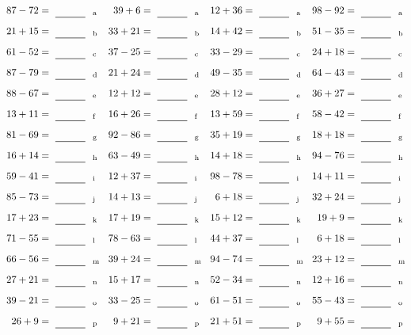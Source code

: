 \documentclass
[
  draft    = true,
  fontsize = 11pt,
  parskip  = half-
]
{scrartcl}
\begin{document}
\clearpage
\begin{align*}
    \pline{87-72}&=\rline{a}
  & \pline{39+6}&=\rline{a}
  & \pline{12+36}&=\rline{a}
  & \pline{98-92}&=\rline{a} \\[1ex]
    \pline{21+15}&=\rline{b}
  & \pline{33+21}&=\rline{b}
  & \pline{14+42}&=\rline{b}
  & \pline{51-35}&=\rline{b} \\[1ex]
    \pline{61-52}&=\rline{c}
  & \pline{37-25}&=\rline{c}
  & \pline{33-29}&=\rline{c}
  & \pline{24+18}&=\rline{c} \\[1ex]
    \pline{87-79}&=\rline{d}
  & \pline{21+24}&=\rline{d}
  & \pline{49-35}&=\rline{d}
  & \pline{64-43}&=\rline{d} \\[1ex]
    \pline{88-67}&=\rline{e}
  & \pline{12+12}&=\rline{e}
  & \pline{28+12}&=\rline{e}
  & \pline{36+27}&=\rline{e} \\[1ex]
    \pline{13+11}&=\rline{f}
  & \pline{16+26}&=\rline{f}
  & \pline{13+59}&=\rline{f}
  & \pline{58-42}&=\rline{f} \\[1ex]
    \pline{81-69}&=\rline{g}
  & \pline{92-86}&=\rline{g}
  & \pline{35+19}&=\rline{g}
  & \pline{18+18}&=\rline{g} \\[1ex]
    \pline{16+14}&=\rline{h}
  & \pline{63-49}&=\rline{h}
  & \pline{14+18}&=\rline{h}
  & \pline{94-76}&=\rline{h} \\[1ex]
    \pline{59-41}&=\rline{i}
  & \pline{12+37}&=\rline{i}
  & \pline{98-78}&=\rline{i}
  & \pline{14+11}&=\rline{i} \\[1ex]
    \pline{85-73}&=\rline{j}
  & \pline{14+13}&=\rline{j}
  & \pline{6+18}&=\rline{j}
  & \pline{32+24}&=\rline{j} \\[1ex]
    \pline{17+23}&=\rline{k}
  & \pline{17+19}&=\rline{k}
  & \pline{15+12}&=\rline{k}
  & \pline{19+9}&=\rline{k} \\[1ex]
    \pline{71-55}&=\rline{l}
  & \pline{78-63}&=\rline{l}
  & \pline{44+37}&=\rline{l}
  & \pline{6+18}&=\rline{l} \\[1ex]
    \pline{66-56}&=\rline{m}
  & \pline{39+24}&=\rline{m}
  & \pline{94-74}&=\rline{m}
  & \pline{23+12}&=\rline{m} \\[1ex]
    \pline{27+21}&=\rline{n}
  & \pline{15+17}&=\rline{n}
  & \pline{52-34}&=\rline{n}
  & \pline{12+16}&=\rline{n} \\[1ex]
    \pline{39-21}&=\rline{o}
  & \pline{33-25}&=\rline{o}
  & \pline{61-51}&=\rline{o}
  & \pline{55-43}&=\rline{o} \\[1ex]
    \pline{26+9}&=\rline{p}
  & \pline{9+21}&=\rline{p}
  & \pline{21+51}&=\rline{p}
  & \pline{9+55}&=\rline{p}
\end{align*}
\end{document}

